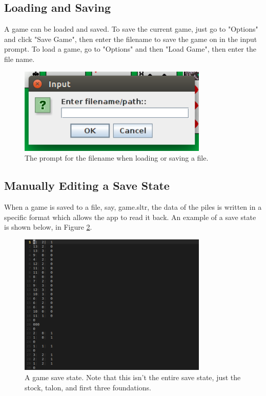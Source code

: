 \documentclass[12pt,a4paper,titlepage]{article}
\begin{document}
	\subsection{Loading and Saving}
	A game can be loaded and saved. To save the current game, just go to
	"Options" and click "Save Game", then enter the filename to save the game on
	in the input prompt. To load a game, go to "Options" and then "Load Game",
	then enter the file name.

	\begin{figure}[H]
		\centering
		\captionsetup{justification=centering}
		\includegraphics[width=9cm]{images/fig5.png}
		\caption{The prompt for the filename when loading or saving a file.}
		\label{fig:fig5}
	\end{figure}

	\subsection{Manually Editing a Save State}
	When a game is saved to a file, say, game.sltr, the data of the piles is
	written in a specific format which allows the app to read it back. An
	example of a save state is shown below, in Figure \ref{fig:fig6}.

	\begin{figure}[H]
		\centering
		\captionsetup{justification=centering}
		\includegraphics[width=9cm]{images/fig6.png}
		\caption{A game save state. Note that this isn't the entire save state,
		just the stock, talon, and first three foundations.}
		\label{fig:fig6}
	\end{figure}
\end{document}
